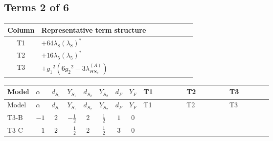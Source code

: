 \documentclass[8pt]{article}
\begin{document}
\begin{landscape}
\subsection*{Terms 2 of 6}
\begin{center}
\begin{tabular}{@{}c >{\raggedright\arraybackslash}p{0.82\linewidth}@{}}
\toprule
Column & Representative term structure \\
\midrule
T1 & \(\displaystyle +64 {\lambda_8} \left({\lambda_8}\right)^{*}\) \\
\midrule
T2 & \(\displaystyle +16 {\lambda_5} \left({\lambda_5}\right)^{*}\) \\
\midrule
T3 & \(\displaystyle +{g_1}^2 \left(6 {g_2}^2-3 {\lambda_{HS_2}^{(A)}}\right)\) \\
\midrule
\bottomrule
\end{tabular}
\end{center}
\smallskip
\tiny
\begin{longtable}{@{}llcccccc >{\raggedright\arraybackslash}p{0.21\linewidth} >{\raggedright\arraybackslash}p{0.21\linewidth} >{\raggedright\arraybackslash}p{0.21\linewidth}@{}}
\toprule
Model & $\alpha$ & $d_{S_1}$ & $Y_{S_1}$ & $d_{S_2}$ & $Y_{S_2}$ & $d_F$ & $Y_F$ & T1 & T2 & T3 \\
\midrule
\endfirsthead
\toprule
Model & $\alpha$ & $d_{S_1}$ & $Y_{S_1}$ & $d_{S_2}$ & $Y_{S_2}$ & $d_F$ & $Y_F$ & T1 & T2 & T3 \\
\midrule
\endhead
T3-B & $-1$ & $2$ & $-\frac{1}{2}$ & $2$ & $\frac{1}{2}$ & $1$ & $0$ & \scriptsize\adjustbox{max width=\linewidth}{$\begin{gathered} +64 {\lambda_8} \left({\lambda_8}\right)^{*}\end{gathered}$} & \scriptsize\adjustbox{max width=\linewidth}{$\begin{gathered} +16 {\lambda_5} \left({\lambda_5}\right)^{*}\end{gathered}$} & \scriptsize\adjustbox{max width=\linewidth}{$\begin{gathered} +{g_1}^2 \left(6 {g_2}^2-3 {\lambda_{HS_2}^{(A)}}\right)\end{gathered}$} \\
\midrule
T3-C & $-1$ & $2$ & $-\frac{1}{2}$ & $2$ & $\frac{1}{2}$ & $3$ & $0$ & \scriptsize\adjustbox{max width=\linewidth}{$\begin{gathered} +64 {\lambda_8} \left({\lambda_8}\right)^{*}\end{gathered}$} & \scriptsize\adjustbox{max width=\linewidth}{$\begin{gathered} +16 {\lambda_5} \left({\lambda_5}\right)^{*}\end{gathered}$} & \scriptsize\adjustbox{max width=\linewidth}{$\begin{gathered} +{g_1}^2 \left(6 {g_2}^2-3 {\lambda_{HS_2}^{(A)}}\right)\end{gathered}$} \\

\end{longtable}
\end{landscape}
\end{document}
